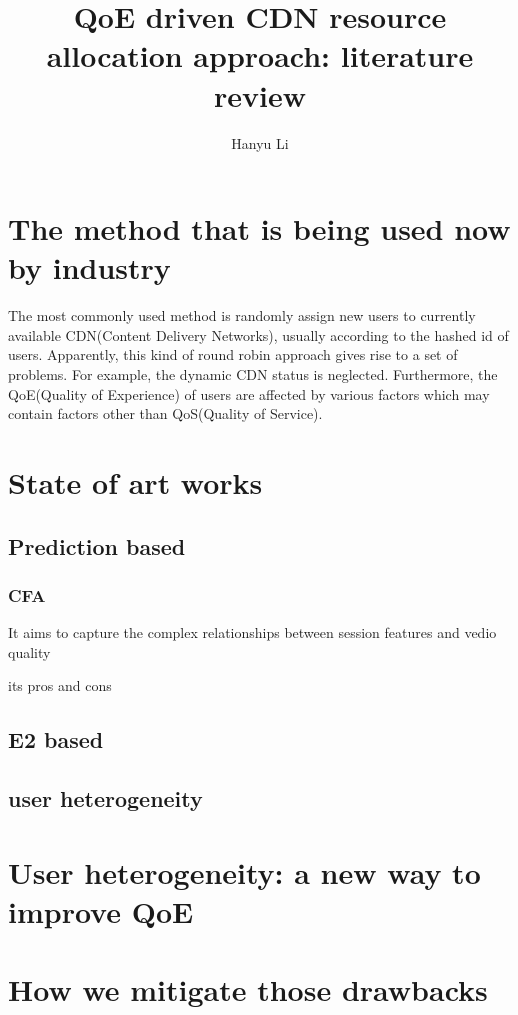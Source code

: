 \documentclass{ctexart}
\title{QoE driven CDN resource allocation approach: literature review}
\author{Hanyu Li}
\begin{document}
\maketitle
\section{The method that is being used now by industry}
The most commonly used method is randomly assign new users to currently available CDN(Content Delivery Networks), usually according to the hashed id of users. Apparently, this kind of round robin approach gives rise to a set of problems. For example, the dynamic CDN status is neglected. Furthermore, the QoE(Quality of Experience) of users are affected by various factors which may contain factors other than QoS(Quality of Service).
\section{State of art works}
\subsection{Prediction based}
\subsubsection{CFA}
\par It aims to capture the complex relationships between session features and vedio quality
\par its pros and cons
\subsection{E2 based}
\subsection{user heterogeneity}
\section{User heterogeneity: a new way to improve QoE}
\section{How we mitigate those drawbacks}


\nocite{*}


\end{document}
